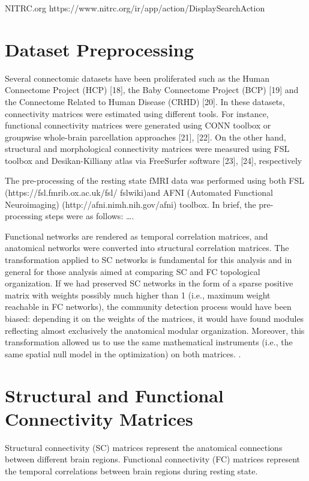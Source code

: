 

NITRC.org
https://www.nitrc.org/ir/app/action/DisplaySearchAction

\section{Dataset Preprocessing}
Several connectomic datasets
have been proliferated such as the Human Connectome
Project (HCP) [18], the Baby Connectome Project (BCP) [19]
and the Connectome Related to Human Disease (CRHD)
[20]. In these datasets, connectivity matrices were estimated
using different tools. For instance, functional connectivity
matrices were generated using CONN toolbox or groupwise
whole-brain parcellation approaches [21], [22]. On the other
hand, structural and morphological connectivity matrices
were measured using FSL toolbox and Desikan-Killiany atlas via FreeSurfer software [23], [24], respectively
\cite{Bessadok2022}

The pre-processing of the resting state fMRI data was
performed using both FSL (https://fsl.fmrib.ox.ac.uk/fsl/
fslwiki)and AFNI (Automated Functional Neuroimaging) (http://afni.nimh.nih.gov/afni) toolbox. 
In brief, the pre-processing steps were as follows: \dots \cite{Zhang2022}.

Functional networks are rendered as temporal correlation matrices, and anatomical networks were converted into structural 
correlation matrices.
The transformation applied to SC networks is fundamental for this analysis and in general for those analysis aimed at 
comparing SC and FC topological organization. 
If we had preserved SC networks in the form of a sparse positive matrix with
weights possibly much higher than 1 (i.e., maximum weight reachable in FC networks), the community detection process would  
have been biased: depending it on the weights of the matrices, it would have found modules reflecting almost exclusively 
the anatomical modular organization.
Moreover, this transformation allowed us to use the same mathematical instruments (i.e., the same spatial null model in 
the optimization) on both matrices.
\cite{Puxeddu2022}.

\section{Structural and Functional Connectivity Matrices}
Structural connectivity (SC) matrices represent the anatomical connections between different brain regions.
Functional connectivity (FC) matrices represent the temporal correlations between brain regions during resting state.

